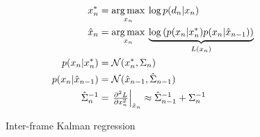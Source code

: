 \begin{figure}
\begin{equation*}
\begin{aligned}
x_n^* &= \operatorname*{arg\,max}_{x_n} \: \log p(d_n|x_n) 
\\
\hat{x}_n &= \operatorname*{arg\,max}_{x_n} \: \underbrace{\log \left( p(x_n|x_n^*) p(x_n |\hat{x}_{n - 1}) \right)}_{L(x_n)}    
\\
p(x_n |x_n^*) &= \mathcal{N}(x_n^*,\Sigma_n) 
\\
p(x_n |\hat{x}_{n - 1}) &= \mathcal{N}(\hat{x}_{n - 1}, \hat{\Sigma}_{n-1})
\\
\hat{\Sigma}_n^{-1} &= \left.\tfrac{\partial^2 L}{\partial x_n^2}\right|_{\hat{x}_n} \approx \hat{\Sigma}_{n-1}^{-1}  + \Sigma_{n}^{-1}
\end{aligned}
\end{equation*}
\caption{Inter-frame Kalman regression}    
\label{fig:interframe}
\end{figure}
